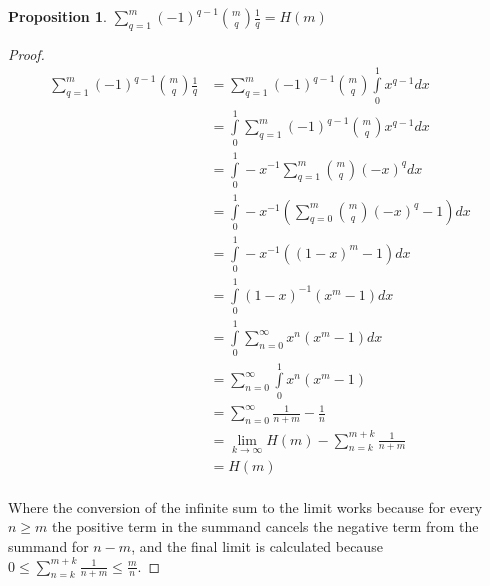 \documentclass[a4paper]{article}
\newtheorem{proposition}{Proposition}
\begin{document}
\begin{proposition}
\(\sum\limits_{q = 1}^m {(-1)}^{q - 1} {m \choose q} \frac{1}{q} = H(m)\)
\end{proposition}

\begin{proof}
\begin{align*}
\sum\limits_{q = 1}^m {(-1)}^{q - 1} {m \choose q} \frac{1}{q} &= \sum\limits_{q = 1}^m {(-1)}^{q - 1} {m \choose q} \int\limits_0^1 x^{q - 1} dx\\
&= \int\limits_0^1 \sum\limits_{q = 1}^m {(-1)}^{q - 1} {m \choose q} x^{q - 1} dx\\
&= \int\limits_0^1 -x^{-1} \sum\limits_{q = 1}^m {m \choose q} {(-x)}^q dx\\
&= \int\limits_0^1 -x^{-1} \left( \sum\limits_{q = 0}^m {m \choose q} {(-x)}^q - 1 \right)dx \\
&= \int\limits_0^1 -x^{-1} \left( {(1 - x)}^m - 1 \right)dx \\
&= \int\limits_0^1 {(1 - x)}^{-1} (x^m - 1) dx \\
&= \int\limits_0^1 \sum\limits_{n = 0}^\infty x^n (x^m - 1) dx \\
&= \sum\limits_{n = 0}^\infty \int\limits_0^1 x^n (x^m - 1) \\
&= \sum\limits_{n = 0}^\infty \frac{1}{n + m} - \frac{1}{n} \\
&= \lim\limits_{k \to \infty}  H(m) - \sum\limits_{n = k}^{m + k} \frac{1}{n + m}\\
&= H(m)\\
\end{align*}

Where the conversion of the infinite sum to the limit works because for every \(n \geq m\) the positive term in the summand cancels the negative term from the summand for \(n - m\),
and the final limit is calculated because \(0 \leq \sum\limits_{n = k}^{m + k} \frac{1}{n + m} \leq \frac{m}{n}\).
\end{proof}

{}

\end{document}
